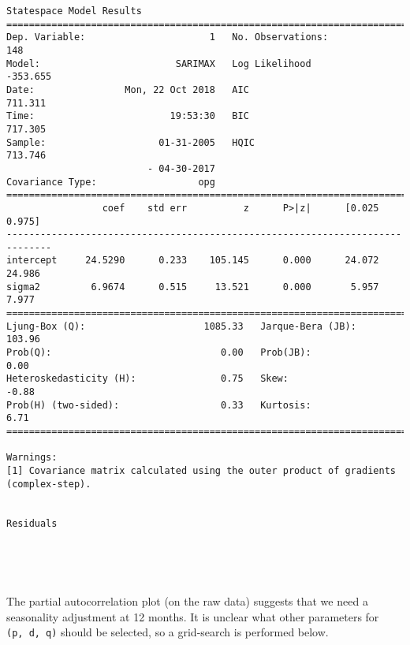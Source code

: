 \documentclass[11pt]{article}
\begin{document}
    \begin{Verbatim}[commandchars=\\\{\}]
                           Statespace Model Results                           
==============================================================================
Dep. Variable:                      1   No. Observations:                  148
Model:                        SARIMAX   Log Likelihood                -353.655
Date:                Mon, 22 Oct 2018   AIC                            711.311
Time:                        19:53:30   BIC                            717.305
Sample:                    01-31-2005   HQIC                           713.746
                         - 04-30-2017                                         
Covariance Type:                  opg                                         
==============================================================================
                 coef    std err          z      P>|z|      [0.025      0.975]
------------------------------------------------------------------------------
intercept     24.5290      0.233    105.145      0.000      24.072      24.986
sigma2         6.9674      0.515     13.521      0.000       5.957       7.977
===================================================================================
Ljung-Box (Q):                     1085.33   Jarque-Bera (JB):               103.96
Prob(Q):                              0.00   Prob(JB):                         0.00
Heteroskedasticity (H):               0.75   Skew:                            -0.88
Prob(H) (two-sided):                  0.33   Kurtosis:                         6.71
===================================================================================

Warnings:
[1] Covariance matrix calculated using the outer product of gradients (complex-step).


Residuals



    \end{Verbatim}

    \begin{center}
    \end{center}
    { \hspace*{\fill} \\}
    
    The partial autocorrelation plot (on the raw data) suggests that we need
a seasonality adjustment at 12 months. It is unclear what other
parameters for \texttt{(p,\ d,\ q)} should be selected, so a grid-search
is performed below.
\end{document}
